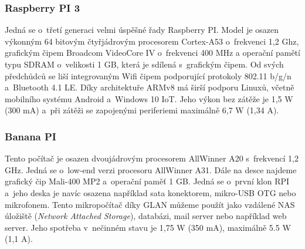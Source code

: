 \subsubsection*{Raspberry PI 3}
Jedná se o~třetí generaci velmi úspěšné řady Raspberry PI. Model je osazen výkonným 64 bitovým čtyřjádrovým procesorem Cortex-A53 o~frekvenci 1,2 Ghz, grafickým čipem Broadcom VideoCore IV o~frekvenci 400 MHz a operační pamětí typu SDRAM o~velikosti 1 GB, která je sdílená s~grafickým čipem. Od svých předchůdců se liší integrovaným Wifi čipem podporující protokoly 802.11 b/g/n a~Bluetooth 4.1 LE. Díky architektuře ARMv8 má širší podporu Linuxů, včetně mobilního systému Android a~Windows 10 IoT. Jeho výkon bez zátěže je 1,5 W (300 mA) a~při zátěži se zapojenými periferiemi maximálně 6,7 W (1,34 A).

\subsubsection*{Banana PI}
Tento počítač je osazen dvoujádrovým procesorem AllWinner A20 s~frekvencí 1,2 GHz. Jedná se o~low-end verzi procesoru AllWinner A31. Dále na desce najdeme grafický čip Mali-400 MP2 a~operační paměť 1 GB. Jedná se o~první klon RPI a~jeho deska je navíc osazena například sata konektorem, mikro-USB OTG nebo mikrofonem. Tento mikropočítač díky GLAN můžeme použít jako vzdálené NAS úložiště (\textit{Network Attached Storage}), databázi, mail server nebo například web server. Jeho spotřeba v~nečinném stavu je 1,75 W (350 mA), maximálně 5.5 W (1,1 A).

